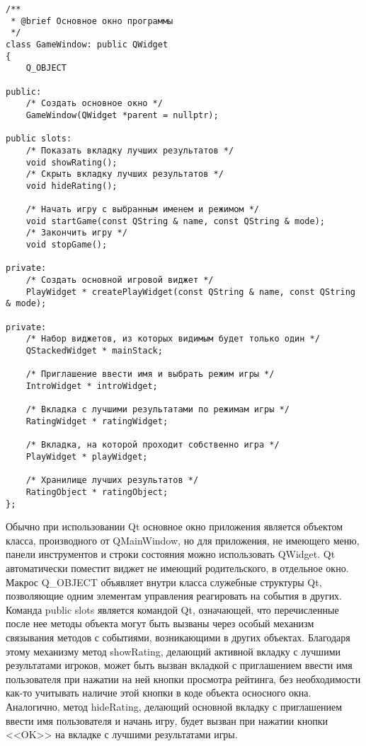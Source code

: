 \documentclass[a4paper,12pt]{article}
\begin{document}
\begin{verbatim}
/**
 * @brief Основное окно программы
 */
class GameWindow: public QWidget
{
    Q_OBJECT

public:
    /* Создать основное окно */
    GameWindow(QWidget *parent = nullptr);

public slots:
    /* Показать вкладку лучших результатов */
    void showRating();
    /* Скрыть вкладку лучших результатов */
    void hideRating();

    /* Начать игру с выбранным именем и режимом */
    void startGame(const QString & name, const QString & mode);
    /* Закончить игру */
    void stopGame();

private:
    /* Создать основной игровой виджет */
    PlayWidget * createPlayWidget(const QString & name, const QString & mode);

private:
    /* Набор виджетов, из которых видимым будет только один */
    QStackedWidget * mainStack;

    /* Приглашение ввести имя и выбрать режим игры */
    IntroWidget * introWidget;

    /* Вкладка с лучшими результатами по режимам игры */
    RatingWidget * ratingWidget;

    /* Вкладка, на которой проходит собственно игра */
    PlayWidget * playWidget;

    /* Хранилище лучших результатов */
    RatingObject * ratingObject;
};
\end{verbatim}

Обычно при использовании Qt основное окно приложения является объектом класса,
производного от QMainWindow, но для приложения, не имеющего меню, панели инструментов
и строки состояния можно использовать QWidget. Qt автоматически поместит виджет
не имеющий родительского, в отдельное окно. Макрос Q\_OBJECT объявляет внутри класса
служебные структуры Qt, позволяющие одним элементам управления реагировать на события
в других. Команда public slots является командой Qt, означающей, что перечисленные
после нее методы объекта могут быть вызваны через особый механизм связывания методов
с событиями, возникающими в других объектах. Благодаря этому механизму метод
showRating, делающий активной вкладку с лучшими результатами игроков, может быть
вызван вкладкой с приглашением ввести имя пользователя при нажатии на ней
кнопки просмотра рейтинга, без необходимости как-то учитывать наличие этой кнопки
в коде объекта осносного окна. Аналогично, метод hideRating, делающий основной вкладку
с приглашением ввести имя пользователя и начань игру, будет вызван при нажатии кнопки
<<OK>> на вкладке с лучшими результатами игры.
\end{document}
